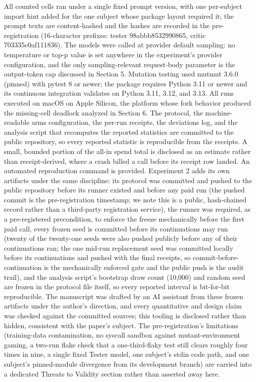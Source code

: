 \documentclass[
  11pt,
]{article}
\begin{document}
All counted cells ran under a single fixed prompt version, with one
per-subject import hint added for the one subject whose package layout
required it; the prompt texts are content-hashed and the hashes are
recorded in the pre-registration (16-character prefixes: tester
98abbb8532990865, critic 703335c0af111836). The models were called at
provider default sampling: no temperature or top-p value is set anywhere
in the experiment's provider configuration, and the only
sampling-relevant request-body parameter is the output-token cap
discussed in Section 5. Mutation testing used mutmut 3.6.0 (pinned) with
pytest 8 or newer; the package requires Python 3.11 or newer and its
continuous integration validates on Python 3.11, 3.12, and 3.13. All
runs executed on macOS on Apple Silicon, the platform whose fork
behavior produced the missing-cell deadlock analyzed in Section 6. The
protocol, the machine-readable arms configuration, the per-run receipts,
the deviations log, and the analysis script that recomputes the reported
statistics are committed to the public repository, so every reported
statistic is reproducible from the receipts. A small, bounded portion of
the all-in spend total is disclosed as an estimate rather than
receipt-derived, where a crash billed a call before its receipt row
landed. An automated reproduction command is provided. Experiment 2 adds
its own artifacts under the same discipline: its protocol was committed
and pushed to the public repository before its runner existed and before
any paid run (the pushed commit is the pre-registration timestamp; we
note this is a public, hash-chained record rather than a third-party
registration service), the runner was required, as a pre-registered
precondition, to enforce the freeze mechanically before the first paid
call, every frozen seed is committed before its continuations may run
(twenty of the twenty-one seeds were also pushed publicly before any of
their continuations ran; the one mid-run replacement seed was committed
locally before its continuations and pushed with the final receipts, so
commit-before-continuation is the mechanically enforced gate and the
public push is the audit trail), and the analysis script's bootstrap
draw count (10,000) and random seed are frozen in the protocol file
itself, so every reported interval is bit-for-bit reproducible. The
manuscript was drafted by an AI assistant from these frozen artifacts
under the author's direction, and every quantitative and design claim
was checked against the committed sources; this tooling is disclosed
rather than hidden, consistent with the paper's subject. The
pre-registration's limitations (training-data contamination, no syscall
sandbox against mutant-environment gaming, a two-run flake check that a
one-third-flaky test still clears roughly four times in nine, a single
fixed Tester model, one subject's stdin code path, and one subject's
pinned-module divergence from its development branch) are carried into a
dedicated Threats to Validity section rather than asserted away here.
\end{document}
